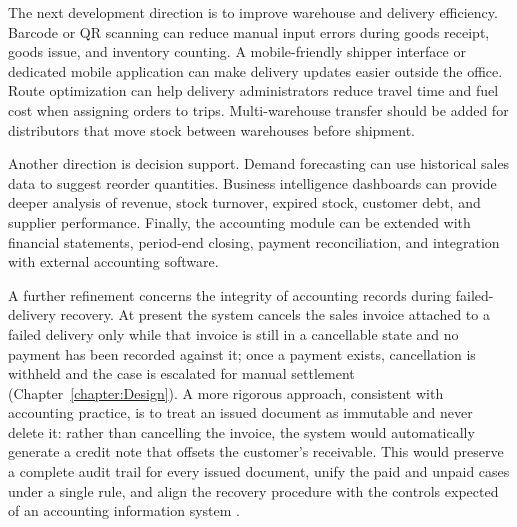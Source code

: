 The next development direction is to improve warehouse and delivery efficiency.
Barcode or QR scanning can reduce manual input errors during goods receipt,
goods issue, and inventory counting. A mobile-friendly shipper interface or
dedicated mobile application can make delivery updates easier outside the
office. Route optimization can help delivery administrators reduce travel time
and fuel cost when assigning orders to trips. Multi-warehouse transfer should be
added for distributors that move stock between warehouses before shipment.

Another direction is decision support. Demand forecasting can use historical
sales data to suggest reorder quantities. Business intelligence dashboards can
provide deeper analysis of revenue, stock turnover, expired stock, customer
debt, and supplier performance. Finally, the accounting module can be extended
with financial statements, period-end closing, payment reconciliation, and
integration with external accounting software.

A further refinement concerns the integrity of accounting records during
failed-delivery recovery. At present the system cancels the sales invoice
attached to a failed delivery only while that invoice is still in a cancellable
state and no payment has been recorded against it; once a payment exists,
cancellation is withheld and the case is escalated for manual settlement
(Chapter~\ref{chapter:Design}). A more rigorous approach, consistent with
accounting practice, is to treat an issued document as immutable and never
delete it: rather than cancelling the invoice, the system would automatically
generate a credit note that offsets the customer's receivable. This would
preserve a complete audit trail for every issued document, unify the paid and
unpaid cases under a single rule, and align the recovery procedure with the
controls expected of an accounting information system \cite{romney2021ais}.
